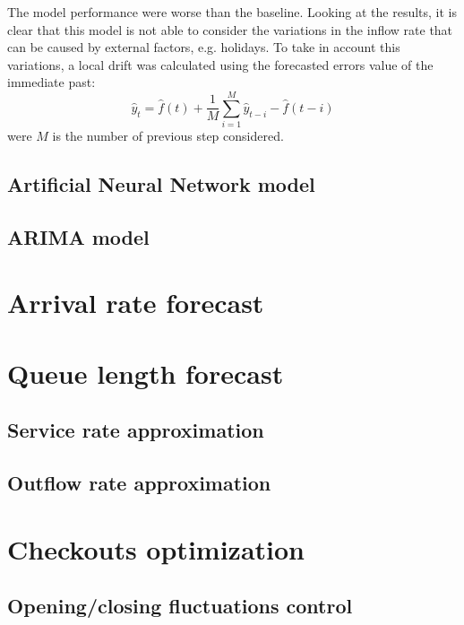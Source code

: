The model performance were worse than the baseline. Looking at the results, it is clear that this model is not able to consider the variations in the inflow rate that can be caused by external factors, e.g. holidays. To take in account this variations, a local drift was calculated using the forecasted errors value of the immediate past:
\[ \hat{y}_t = \hat{f}(t) + \frac{1}{M} \sum_{i=1}^{M} \hat{y}_{t-i} - \hat{f}(t-i) \]
were \(M\) is the number of previous step considered.

\subsection{Artificial Neural Network model}
\label{subsec:ann_mode.}

\subsection{ARIMA model}
\label{subsec:arima_model}

\section{Arrival rate forecast}
\label{sec:arrival_rate_forecast}

\section{Queue length forecast}
\label{sec:queue_length_forecasting}

\subsection{Service rate approximation}
\label{subsec:service_rate_approximation}

\subsection{Outflow rate approximation}
\label{subsec:outflow_rate_approximation}

\section{Checkouts optimization}
\label{sec:checkouts_optimization}

\subsection{Opening/closing fluctuations control}
\label{subsec:opening_closing_fluctuations_control}

\clearpage
